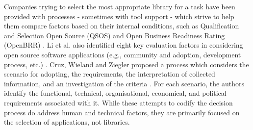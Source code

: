 Companies trying to select the most appropriate library for a task have been provided with processes - sometimes with tool support - which strive to help them compare factors based on their internal conditions, such as Qualification and Selection Open Source (QSOS) and Open Business Readiness Rating (OpenBRR) \cite{deprez2008comparing, semeteys2008method, wasserman2017osspal}. Li et al. also identified eight key evaluation factors in considering open source software applications (e.g., community and adoption, development process, etc.) \cite{li2022exploring}.  Cruz, Wieland and Ziegler proposed a process which considers the scenario for adopting, the requirements, the interpretation of collected information, and an investigation of the criteria \cite{cruz2006evaluation}. For each scenario, the authors identify the functional, technical, organisational, economical, and political requirements associated with it. While these attempts to codify the decision process do address human and technical factors, they are primarily focused on the selection of applications, not libraries.
